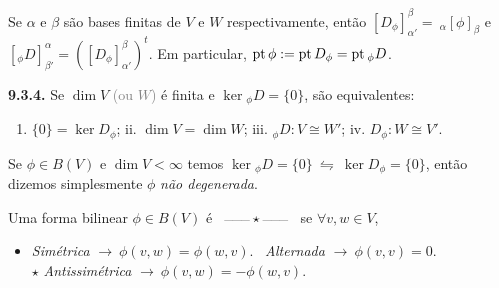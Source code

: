 \newcommand{\pt}{\operatorname{pt}}

\begin{proposition}
    \label{prop:933}
    Se \(\alpha \) e \(\beta \) são bases finitas de \(V \) e \(W\) respectivamente, então \([ D_\phi]^\beta_{\alpha'} = \ _\alpha[\phi]_\beta\) e \([_\phi D]^\alpha_{\beta'} = ([ D_\phi]^\beta_{\alpha'})^t\). Em particular, \(\pt \phi := \pt D_\phi = \pt \hspace{0.01cm} _\phi D \). 
\end{proposition}


\begin{corollary}
    \textbf{9.3.4.} Se \(\dim V\) \textcolor{gray}{(ou \(W\))} é finita e \( \ker {_\phi D} = \{0\}\), são equivalentes: %
    \vspace{-0.2cm}
    \begin{enumerate}[left = -0.1cm, label = \roman*.]
        \item \(\{0\} = \ker D_\phi\);  \hfill ii. \(\dim V = \dim W\); \hfill iii. \(_\phi D : V \cong W'\); \hfill iv. \(D_\phi: W \cong V'\). 
    \end{enumerate}
\end{corollary}


\begin{note}
    Se \(\phi \in B(V)\) e \(\dim V < \infty \) temos \(\ker {_\phi D} = \{0\} \ \leftrightharpoons\ \ker D_\phi = \{0\}\), então dizemos simplesmente \(\phi\) \emph{não degenerada}. 
\end{note}

\begin{definition}
    Uma forma bilinear \(\phi \in B(V)\)  é \ \(\textcolor{gray}{\rotatebox{90}{\Big|}}\star\textcolor{gray}{\rotatebox{90}{\Big|}}\) \ se \(\forall v,w \in V\), 
    \vspace{-0.2cm}
    \begin{itemize}[label = \(\star\)]
        \item \emph{Simétrica} \(\rightarrow \ \phi(v,w) = \phi(w,v)\). \hspace{1.4cm}{ \(\star\)} \ \emph{Alternada} \(\rightarrow \ \phi(v,v) = 0\). \vspace{0.3cm}\\
        \- \hspace{3cm}\(\star\) \emph{Antissimétrica} \(\rightarrow \ \phi(v,w) =- \phi(w,v) \). 
    \end{itemize}
\end{definition}

